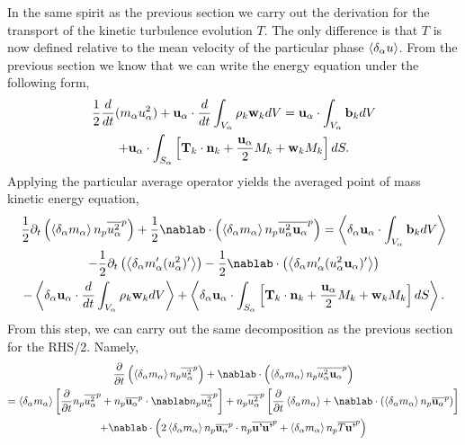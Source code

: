In the same spirit as the previous section we carry out the derivation for the transport of the kinetic turbulence evolution $T$. 
The only difference is that $T$ is now defined relative to the mean velocity of the particular phase $\left<\delta_\alpha u\right>$.  
From the previous section we know that we can write the energy equation under the following form, 
\begin{multline*}
    \frac{1}{2}\frac{d}{d t} (m_\alpha u^2_\alpha)
    + \textbf{u}_\alpha \cdot \frac{d}{d t} \int_{V_\alpha} \rho_k \textbf{w}_k dV 
    = \textbf{u}_\alpha \cdot \int_{V_\alpha} \textbf{b}_k dV\\
    + \textbf{u}_\alpha \cdot \int_{S_\alpha} \left[
    \textbf{T}_k \cdot\textbf{n}_k
    +\frac{\textbf{u}_\alpha}{2} M_k
    +\textbf{w}_k M_k
    \right]dS.
\end{multline*}
Applying the particular average operator yields the averaged point of mass kinetic energy equation, 
\begin{multline*}
    \frac{1}{2}\pddt   \left(\pavg{m_\alpha} \pnavg{u^2_\alpha}\right)
    + \frac{1}{2}\nablab \cdot \left(\pavg{m_\alpha} \pnavg{u^2_\alpha \textbf{u}_\alpha}\right) 
    = \pavg{\textbf{u}_\alpha \cdot \int_{V_\alpha} \textbf{b}_k dV}\\
    - \frac{1}{2}\pddt \left(\pavg{m_\alpha'(u_\alpha^2)'}\right)
    - \frac{1}{2}\nablab\cdot\left(\pavg{m_\alpha' (u_\alpha^2 \textbf{u}_\alpha)'}\right)\\
    - \pavg{\textbf{u}_\alpha \cdot \ddt \int_{V_\alpha} \rho_k \textbf{w}_k dV} 
    + \pavg{\textbf{u}_\alpha \cdot \int_{S_\alpha} \left[
    \textbf{T}_k \cdot\textbf{n}_k
    +\frac{\textbf{u}_\alpha}{2} M_k
    +\textbf{w}_k M_k
    \right]dS}.
\end{multline*}
From this step, we can carry out the same decomposition as the previous section for the RHS/2. 
Namely, 
\begin{multline*}
    \frac{\partial }{\partial t}\left(
        \pavg{m_\alpha}
        \pnavg{u^2_\alpha}
    \right)+
    \nablab\cdot \left(
        \pavg{m_\alpha}
        \pnavg{u^2_\alpha\textbf{u}_\alpha}
    \right) \\
    =
    \pavg{m_\alpha}
    \left[
        \frac{\partial }{\partial t}\pnavg{u^2_\alpha}
        + 
        \pnavg{\textbf{u}_\alpha}
        \cdot\nablab 
        \pnavg{u^2_\alpha}
    \right]
    +\pnavg{u^2_\alpha} \left[
        \frac{\partial }{\partial t}\pavg{m_\alpha}
        + \nablab\cdot \left(
            \pavg{m_\alpha}
            \pnavg{\textbf{u}_\alpha}
        \right)
    \right]\\
    + \nablab\cdot \left(
        2\pavg{m_\alpha}
        \pnavg{\textbf{u}_\alpha}\cdot\pnavg{\textbf{u'}\textbf{u'}} 
        + \pavg{m_\alpha} \pnavg{T \textbf{u'}}
    \right)
\end{multline*}

